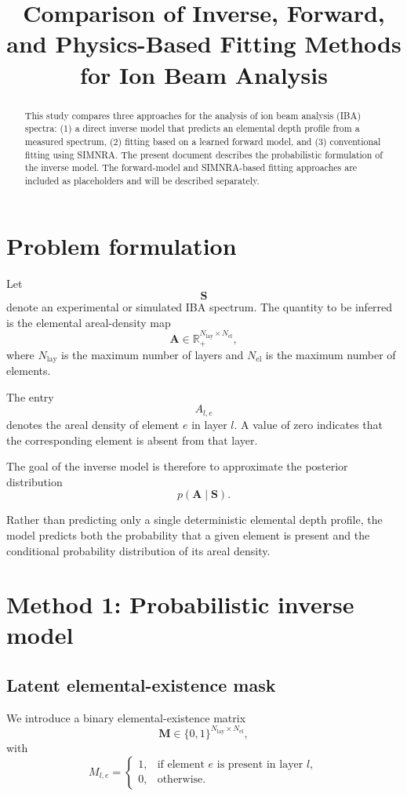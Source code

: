 \documentclass[11pt,a4paper]{article}
\title{Comparison of Inverse, Forward, and Physics-Based Fitting Methods for Ion Beam Analysis}
\author{}
\date{}
\begin{document}
\maketitle

\begin{abstract}
This study compares three approaches for the analysis of ion beam analysis (IBA) spectra:
(1) a direct inverse model that predicts an elemental depth profile from a measured spectrum,
(2) fitting based on a learned forward model, and
(3) conventional fitting using SIMNRA.
The present document describes the probabilistic formulation of the inverse model.
The forward-model and SIMNRA-based fitting approaches are included as placeholders and will be described separately.
\end{abstract}

\section{Problem formulation}

Let
\[
\bm{S}
\]
denote an experimental or simulated IBA spectrum. The quantity to be inferred is the elemental areal-density map
\[
\bm{A}
\in
\mathbb{R}_{+}^{N_{\mathrm{lay}}\times N_{\mathrm{el}}},
\]
where $N_{\mathrm{lay}}$ is the maximum number of layers and
$N_{\mathrm{el}}$ is the maximum number of elements.

The entry
\[
A_{l,e}
\]
denotes the areal density of element $e$ in layer $l$. A value of zero indicates that the corresponding element is absent from that layer.

The goal of the inverse model is therefore to approximate the posterior distribution
\[
p(\bm{A}\mid\bm{S}).
\]

Rather than predicting only a single deterministic elemental depth profile, the model predicts both the probability that a given element is present and the conditional probability distribution of its areal density.

\section{Method 1: Probabilistic inverse model}

\subsection{Latent elemental-existence mask}

We introduce a binary elemental-existence matrix
\[
\bm{M}
\in
\{0,1\}^{N_{\mathrm{lay}}\times N_{\mathrm{el}}},
\]
with
\[
M_{l,e}
=
\begin{cases}
1, & \text{if element $e$ is present in layer $l$},\\
0, & \text{otherwise}.
\end{cases}
\]
\end{document}
